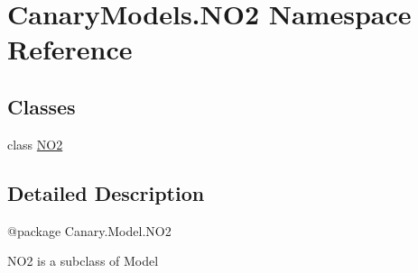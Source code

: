 \hypertarget{namespace_canary_models_1_1_n_o2}{\section{Canary\-Models.\-N\-O2 Namespace Reference}
\label{namespace_canary_models_1_1_n_o2}
}
\subsection*{Classes}
\begin{DoxyCompactItemize}
\item 
class \hyperlink{class_canary_models_1_1_n_o2_1_1_n_o2}{N\-O2}
\end{DoxyCompactItemize}


\subsection{Detailed Description}
\begin{DoxyVerb}@package Canary.Model.NO2

NO2 is a subclass of Model
\end{DoxyVerb}
 